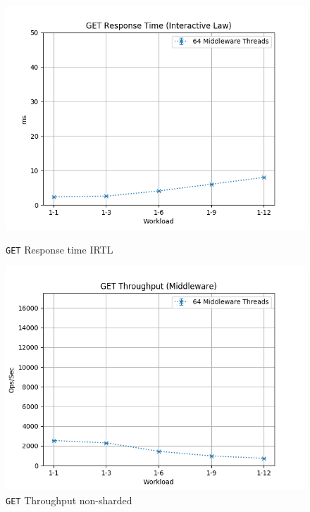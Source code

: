 \documentclass[11pt,a4paper]{article}
\begin{document}
%
\begin{figure}[H]
	\centering
	\captionsetup{width=0.4\textwidth}
    \begin{minipage}{0.5\textwidth}
        \includegraphics[width=\textwidth]{../illustrations/plots/4_2_full_system_read/64/middleware_interactive_get_rt_ms.png}
        \caption{\texttt{GET} Response time IRTL}
        \label{fig:full_system_read_mw_rt_it}
    \end{minipage}\hfill
    \begin{minipage}{0.5\textwidth}
        \centering
        \includegraphics[width=\textwidth]{../illustrations/plots/4_2_full_system_read/64/middleware_get_tp_s.png}
        \caption{\texttt{GET} Throughput non-sharded}
        \label{fig:full_system_read_mw_tp}
    \end{minipage}
\end{figure}
\end{document}
